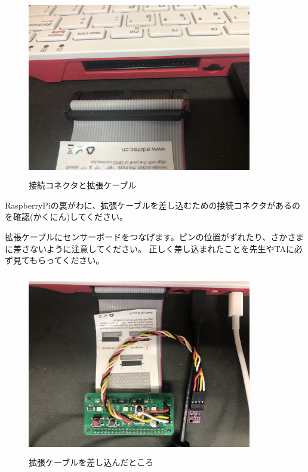 \begin{figure}[H]
    \begin{center}
        \includegraphics[keepaspectratio,width=9.79cm,height=7.955cm]{text02-img/sensor2.jpg}
        \caption{接続コネクタと拡張ケーブル}
    \end{center}
\end{figure}

RaspberryPiの裏がわに、拡張ケーブルを差し込むための接続コネクタがあるのを確認(かくにん)してください。

拡張ケーブルにセンサーボードをつなげます。ピンの位置がずれたり、さかさまに差さないように注意してください。
正しく差し込まれたことを先生やTAに必ず見てもらってください。

\begin{figure}[H]
    \begin{center}
        \includegraphics[keepaspectratio,width=9.79cm,height=7.955cm]{text02-img/sensor3.jpg}
        \caption{拡張ケーブルを差し込んだところ}
    \end{center}
\end{figure}

